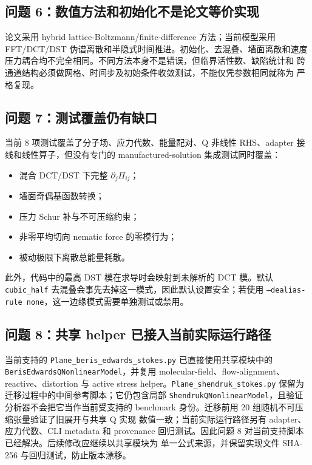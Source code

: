 \documentclass[UTF8,11pt,a4paper]{ctexart}
\begin{document}
\subsection{问题 6：数值方法和初始化不是论文等价实现}

论文采用 hybrid lattice-Boltzmann/finite-difference 方法；当前模型采用
FFT/DCT/DST 伪谱离散和半隐式时间推进。初始化、去混叠、墙面离散和速度
压力耦合均不完全相同。不同方法本身不是错误，但临界活性数、缺陷统计和
跨通道结构必须做网格、时间步及初始条件收敛测试，不能仅凭参数相同就称为
严格复现。

\subsection{问题 7：测试覆盖仍有缺口}

当前 8 项测试覆盖了分子场、应力代数、能量配对、Q 非线性 RHS、adapter
接线和线性算子，但没有专门的
manufactured-solution 集成测试同时覆盖：
\begin{itemize}
  \item 混合 DCT/DST 下完整 $\partial_j\Pi_{ij}$；
  \item 墙面奇偶基函数转换；
  \item 压力 Schur 补与不可压缩约束；
  \item 非零平均切向 nematic force 的零模行为；
  \item 被动极限下离散总能量耗散。
\end{itemize}
此外，代码中的最高 DST 模在求导时会映射到未解析的 DCT 模。默认
\texttt{cubic\_half} 去混叠会事先去掉这一模式，因此默认设置安全；若使用
\texttt{--dealias-rule none}，这一边缘模式需要单独测试或禁用。

\subsection{问题 8：共享 helper 已接入当前实际运行路径}

当前支持的 \texttt{Plane\_beris\_edwards\_stokes.py} 已直接使用共享模块中的
\texttt{BerisEdwardsQNonlinearModel}，并复用 molecular-field、flow-alignment、
reactive、distortion 与 active stress helper。\texttt{Plane\_shendruk\_stokes.py}
保留为迁移过程中的中间参考脚本；它仍包含局部
\texttt{ShendrukQNonlinearModel}，且验证分析器不会把它当作当前受支持的
benchmark 身份。迁移前用 20 组随机不可压缩张量验证了旧展开与共享 Q 实现
数值一致；当前实际运行路径另有 adapter、应力代数、CLI metadata 和 provenance
回归测试。因此问题 8 对当前支持脚本已经解决。后续修改应继续以共享模块为
单一公式来源，并保留实现文件 SHA-256 与回归测试，防止版本漂移。
\end{document}
